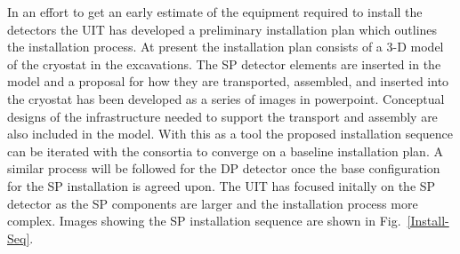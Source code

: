 In an effort to get an early estimate of the equipment required to install the detectors the UIT has developed a preliminary installation plan which outlines the installation process. At present the installation plan consists of a 3-D model of the cryostat in the excavations. The SP detector elements are inserted in the model and a proposal for how they are transported, assembled, and inserted into the cryostat has been developed as a series of images in powerpoint. Conceptual designs of the infrastructure needed to support the transport and assembly are also included in the model. With this as a tool the proposed installation sequence can be iterated with the consortia to converge on a baseline installation plan. A similar process will be followed for the DP detector once the base configuration for the SP installation is agreed upon. The UIT has focused initally on the SP detector as the SP components are larger and the installation process more complex. Images showing the SP installation sequence are shown in Fig.~\ref{Install-Seq}. 
